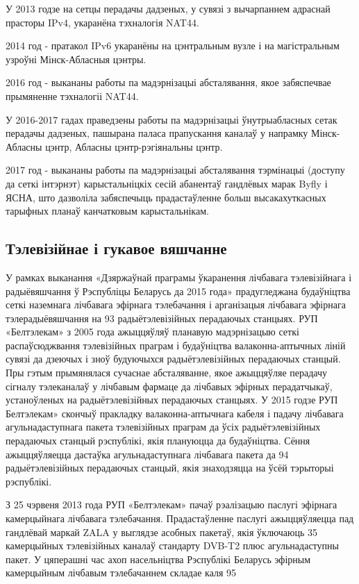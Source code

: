 У 2013 годзе на сетцы перадачы дадзеных, у сувязі з вычарпаннем адраснай прасторы IPv4, укаранёна тэхналогія NAT44.

2014 год - пратакол IPv6 укаранёны на цэнтральным вузле і на магістральным узроўні Мінск-Абласныя цэнтры.

2016 год - выкананы работы па мадэрнізацыі абсталявання, якое забяспечвае прымяненне тэхналогіі NAT44.

У 2016-2017 гадах праведзены работы па мадэрнізацыі ўнутрыабласных сетак перадачы дадзеных, пашырана паласа прапускання каналаў у напрамку Мінск-Абласны цэнтр, Абласны цэнтр-рэгіянальны цэнтр.

2017 год - выкананы работы па мадэрнізацыі абсталявання тэрмінацыі (доступу да сеткі інтэрнэт) карыстальніцкіх сесій абанентаў гандлёвых марак Byfly і ЯСНА, што дазволіла забяспечыць прадастаўленне больш высакахуткасных тарыфных планаў канчатковым карыстальнікам.

\subsection{Тэлевізійнае і гукавое вяшчанне}
У рамках выканання «Дзяржаўнай праграмы ўкаранення лічбавага тэлевізійнага і радыёвяшчання ў Рэспубліцы Беларусь да 2015 года» прадугледжана будаўніцтва сеткі наземнага лічбавага эфірнага тэлебачання і арганізацыя лічбавага эфірнага тэлерадыёвяшчання на 93 радыётэлевізійных перадаючых станцыях. РУП «Белтэлекам» з 2005 года ажыццяўляў планавую мадэрнізацыю сеткі распаўсюджвання тэлевізійных праграм і будаўніцтва валаконна-аптычных ліній сувязі да дзеючых і зноў будуючыхся радыётэлевізійных перадаючых станцый. Пры гэтым прымянялася сучаснае абсталяванне, якое ажыццяўляе перадачу сігналу тэлеканалаў у лічбавым фармаце да лічбавых эфірных перадатчыкаў, устаноўленых на радыётэлевізійных перадаючых станцыях. У 2015 годзе РУП Белтэлекам» скончыў пракладку валаконна-аптычнага кабеля і падачу лічбавага агульнадаступнага пакета тэлевізійных праграм да ўсіх радыётэлевізійных перадаючых станцый рэспублікі, якія плануюцца да будаўніцтва. Сёння ажыццяўляецца дастаўка агульнадаступнага лічбавага пакета да 94 радыётэлевізійных перадаючых станцый, якія знаходзяцца на ўсёй тэрыторыі рэспублікі.

З 25 чэрвеня 2013 года РУП «Белтэлекам» пачаў рэалізацыю паслугі эфірнага камерцыйнага лічбавага тэлебачання. Прадастаўленне паслугі ажыццяўляецца пад гандлёвай маркай ZALA у выглядзе асобных пакетаў, якія ўключаюць 35 камерцыйных тэлевізійных каналаў стандарту DVB-T2 плюс агульнадаступны пакет. У цяперашні час ахоп насельніцтва Рэспублікі Беларусь эфірным камерцыйным лічбавым тэлебачаннем складае каля 95%

